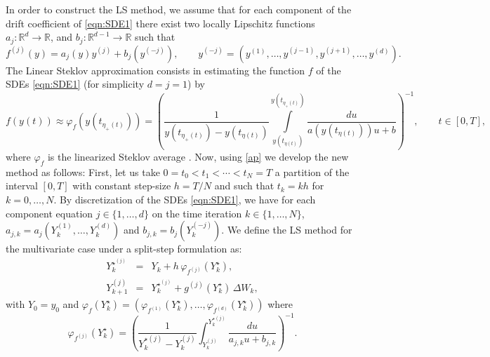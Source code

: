\documentclass[sort&compress, preprint]{elsarticle}
\theoremstyle{definition}
\theoremstyle{plain}%
\theoremstyle{remark}
\newcommand{\SM}{LS\xspace}
\begin{document}
\newcommand{\BigFig}[1]{\parbox{12pt}{\Huge #1}}
\newcommand{\BigZero}{\BigFig{0}}
%
In order to construct the LS method, we assume that  for each component of the drift coefficient of \eqref{eqn:SDE1} there exist 
two locally Lipschitz functions $a_j:\mathbb{R}^{d} \to \mathbb{R}$, and
		$b_{j}:\mathbb{R}^{d-1} \to \mathbb{R}$ such that 
		\begin{equation}\label{eqn:AlternativeConstruction}
		f^{(j)}(y) = a_j (y) y^{(j)} + b_{j}(y^{(-j)}), \qquad
		y^{(-j)} = (y^{(1)}, \dots ,y^{(j-1)}, y^{(j+1)}, \dots, y^{(d)}).
		\end{equation}
The Linear Steklov approximation consists in estimating the function $f$ of 
	the SDEs \eqref{eqn:SDE1} (for simplicity $d=j=1$) by 
\begin{equation} \label{ap}
	f(y(t)) \approx 
		\varphi_{f}(y(t_{\eta_{+}(t)})) =
		\left(
			\frac{1}{y(t_{\eta_+(t)})-y(t_{\eta (t)})}
			\int \limits
_				{y(t_{\eta(t)})}^{y(t_{\eta_+(t)})}
					\frac{du}
						{
							a(y(t_{\eta(t)}))u
							+b
						}
	\right)^{-1}, \qquad t\in [0,T],
\end{equation}
where  $\varphi_f$ 
is the linearized Steklov average \cite{Diaz-Infante2015}. 
Now, using \eqref{ap} we develop the new  method as follows: 
First, let us take  $0=t_0 < t_1< \cdots < t_N=T$ a partition of the interval $[0,T]$ with 
constant step-size $h=T/N$ and such that $t_k=kh$ for $k=0,\ldots, N$.  By discretization
of the SDEs \eqref{eqn:SDE1}, we have for  each component equation $j\in\{1, \ldots,  d\}$ 
	on  the time iteration  $k\in\{1, \ldots,  N\}$, 
	$a_{j,k} =a_j
	\left(
		Y^{(1)}_{k},
		\ldots, Y^{(d)}_{k}
	\right)$  and $b_{j,k} =
	b_{j}
	\left(
			Y^{(-j)}_k
	\right)$. We define the \SM method for 
	the multivariate case under 
a split-step  formulation as:
\begin{eqnarray}
 	Y_{k}^{{\star}^{(j)}} &=& Y_k + h\, \varphi_{f^{(j)}}(Y^{\star}_k), \label{eqn:SSLSM1}\\
	Y_{k+1}^{(j)}	&=& Y_k^{{\star}^{(j)}} + g^{(j)}(Y_k^{\star})\, \Delta W_k 
	\label{eqn:SSLSM2},
\end{eqnarray}
with $Y_0=y_0$ and  $	\varphi_{f}(Y_k^{\star})=
		\left(
			\varphi_{f^{(1)}}(Y_k^{\star}),
			\ldots,
			\varphi_{f^{(d)}}(Y_k^{\star})
		\right)$
where
\begin{equation}\label{fi}
	\varphi_{f^{(j)}}\left(Y_k^{\star}\right)
		=
		\left(
			\frac{1}{Y_{k}^{\star(j)}-Y_{k}^{(j)}}
			\int 
				_{Y_{k}^{(j)}}^{Y_{k}^{\star(j)}}
				\frac{du}
				{
					a_{j,k} u
					+b_{j,k}
				}
		\right)^{-1}.
\end{equation}	
\end{document}
